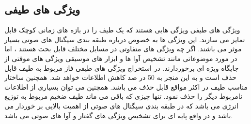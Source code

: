 \documentclass[conference]{IEEEtran}
\begin{document}
    \subsection{ ویژگی های طیفی  }
ویژگی های طیفی ویژگی هایی هستند که یک طیف را در بازه های زمانی کوچک قابل تمایز می سازند. این ویژگی ها به خصوص درباره طبقه بندی سیگنال های صوتی بسیار موثر می باشند. اگر چه ویژگی های متفاوتی در مسایل مختلف قابل بحث هستند ، اما در مورد موضوعاتی مانند تشخیص آوا ها و ابزار های موسیقی ویژگی های موقتی از جایگاه ویژه ای برخوردارند.
در استخراج ویژگی های طیفی فاز مربوط به طیف قابل حذف است و به این منجر به 50 در صد کاهش اطلاعات خواهد شد. همچنین ساختار مناسب طیف در اکثر مواقع قابل حذف می باشد. همچنین می توان بسیاری از اطلاعات نامربوط دیگر را حذف نمود. تنها چیزی که باقی می ماند طیف ضخیم مربوط به توزیع انرژی می باشد که در طبقه بندی سیگنال های صوتی از اهمیت بالایی بر خوردار می باشد و در واقع پایه ای برای تشخیص ویژگی های گفتار و آوا های صوتی می باشد.
\end{document}
